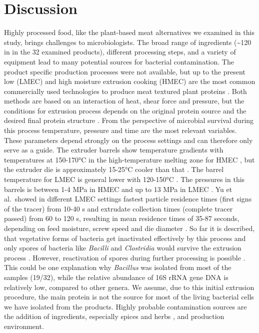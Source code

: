 \documentclass[preprint, 3p,
authoryear]{elsarticle} %
\begin{document}
\hypertarget{discussion}{%
\section{Discussion}\label{discussion}}

Highly processed food, like the plant-based meat alternatives we
examined in this study, brings challenges to microbiologists. The broad
range of ingredients (\textasciitilde120 in in the 32 examined
products), different processing steps, and a variety of equipment lead
to many potential sources for bacterial contamination. The product
specific production processes were not available, but up to the present
low (LMEC) and high moisture extrusion cooking (HMEC) are the most
common commercially used technologies to produce meat textured plant
proteins \citep{Dekkers.2018}. Both methods are based on an interaction
of heat, shear force and pressure, but the conditions for extrusion
process depends on the original protein source and the desired final
protein structure \citep{Lin.2002, Beniwal.2021, Ferawati.2021} . From
the perspective of microbial survival during this process temperature,
pressure and time are the most relevant variables. These parameters
depend strongly on the process settings and can therefore only serve as
a guide. The extruder barrels show temperature gradients with
temperatures at 150-170°C in the high-temperature melting zone for HMEC
\citep{Schmid.2022}, but the extruder die is approximately 15-25°C
cooler than that \citep{Lin.2000}. The barrel temperature for LMEC is
general lower with 120-150°C \citep{Guyony.2022}. The pressures in this
barrels is between 1-4 MPa in HMEC and up to 13 MPa in LMEC
\citep{Kristiawan.2018, Pietsch.2019, Guyony.2022}. Yu et al.~showed in
different LMEC settings fastest particle residence times (first signs of
the tracer) from 10-40 s and extrudate collection times (complete tracer
passed) from 60 to 120 s, resulting in mean residence times of 35-87
seconds, depending on feed moisture, screw speed and die diameter
\citep{Yu.2014}. So far it is described, that vegetative forms of
bacteria get inactivated effectively by this process and only spores of
bacteria like \emph{Bacilli} and \emph{Clostridia} would survive the
extrusion process \citep{Mwangi.2008, Leutgeb.2017}. However,
reactivation of spores during further processing is possible
\citep{Filho.2005}. This could be one explanation why \emph{Bacillus}
was isolated from most of the samples (19/32), while the relative
abundance of 16S rRNA gene DNA is relatively low, compared to other
genera. We assume, due to this initial extrusion procedure, the main
protein is not the source for most of the living bacterial cells we have
isolated from the products. Highly probable contamination sources are
the addition of ingredients, especially spices and herbs
\citep{Sagoo.2009}, and production environment.
\end{document}
